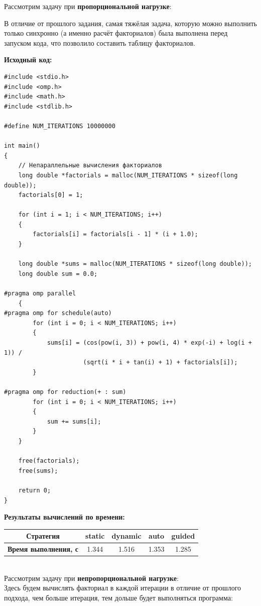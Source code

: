 \documentclass[a4paper,14pt]{extarticle}
\begin{document}
Рассмотрим задачу при \textbf{пропорциональной нагрузке}:

В отличие от прошлого задания, самая тяжёлая задача, которую можно выполнить только синхронно (а именно расчёт
факториалов) была выполнена перед запуском кода, что позволило составить таблицу факториалов. 

\textbf{Исходный код:}
\begin{verbatim}
#include <stdio.h>
#include <omp.h>
#include <math.h>
#include <stdlib.h>

#define NUM_ITERATIONS 10000000

int main()
{
    // Непараллельные вычисления факториалов
    long double *factorials = malloc(NUM_ITERATIONS * sizeof(long double));
    factorials[0] = 1;

    for (int i = 1; i < NUM_ITERATIONS; i++)
    {
        factorials[i] = factorials[i - 1] * (i + 1.0);
    }

    long double *sums = malloc(NUM_ITERATIONS * sizeof(long double));
    long double sum = 0.0;

#pragma omp parallel
    {
#pragma omp for schedule(auto)
        for (int i = 0; i < NUM_ITERATIONS; i++)
        {
            sums[i] = (cos(pow(i, 3)) + pow(i, 4) * exp(-i) + log(i + 1)) /
                      (sqrt(i * i + tan(i) + 1) + factorials[i]);
        }

#pragma omp for reduction(+ : sum)
        for (int i = 0; i < NUM_ITERATIONS; i++)
        {
            sum += sums[i];
        }
    }

    free(factorials);
    free(sums);

    return 0;
}
\end{verbatim}

\textbf{Результаты вычислений по времени:}\\
\begin{tabular}{|c|c|c|c|c|}
    \hline
    \textbf{Стратегия} & static & dynamic & auto & guided \\ 
    \hline
    \textbf{Время выполнения, с} & 1.344 & 1.516 & 1.353 & 1.285 \\
    \hline
\end{tabular}\\

Рассмотрим задачу при \textbf{непропорциональной нагрузке}:\\

Здесь будем вычислять факториал в каждой итерации в отличие от прошлого подхода, чем больше
итерация, тем дольше будет выполняться программа:\\
\end{document}
